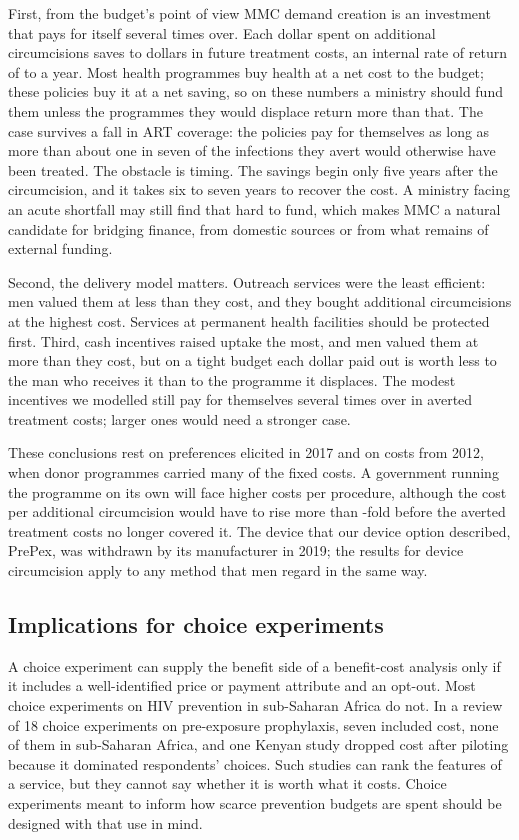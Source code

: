 \documentclass[11pt]{article}
\numberwithin{equation}{section}\numberwithin{figure}{section}\numberwithin{table}{section}
\begin{document}
First, from the budget's point of view MMC demand creation is an investment that pays for itself several times over. Each dollar spent on additional circumcisions saves \mmcBreturnMin{} to \mmcBreturnMax{} dollars in future treatment costs, an internal rate of return of \mmcBirrMin{} to \mmcBirrMax{} a year. Most health programmes buy health at a net cost to the budget; these policies buy it at a net saving, so on these numbers a ministry should fund them unless the programmes they would displace return more than that. The case survives a fall in ART coverage: the policies pay for themselves as long as more than about one in seven of the infections they avert would otherwise have been treated. The obstacle is timing. The savings begin only five years after the circumcision, and it takes six to seven years to recover the cost. A ministry facing an acute shortfall may still find that hard to fund, which makes MMC a natural candidate for bridging finance, from domestic sources or from what remains of external funding.

Second, the delivery model matters. Outreach services were the least efficient: men valued them at less than they cost, and they bought additional circumcisions at the highest cost. Services at permanent health facilities should be protected first. Third, cash incentives raised uptake the most, and men valued them at more than they cost, but on a tight budget each dollar paid out is worth less to the man who receives it than to the programme it displaces. The modest incentives we modelled still pay for themselves several times over in averted treatment costs; larger ones would need a stronger case.

These conclusions rest on preferences elicited in 2017 and on costs from 2012, when donor programmes carried many of the fixed costs. A government running the programme on its own will face higher costs per procedure, although the cost per additional circumcision would have to rise more than \mmcBreturnMin-fold before the averted treatment costs no longer covered it. The device that our device option described, PrePex, was withdrawn by its manufacturer in 2019;\cite{Star2019} the results for device circumcision apply to any method that men regard in the same way.

\subsection{Implications for choice experiments}
A choice experiment can supply the benefit side of a benefit-cost analysis only if it includes a well-identified price or payment attribute and an opt-out. Most choice experiments on HIV prevention in sub-Saharan Africa do not. In a review of 18 choice experiments on pre-exposure prophylaxis, seven included cost, none of them in sub-Saharan Africa,\cite{Wulandari2022} and one Kenyan study dropped cost after piloting because it dominated respondents' choices.\cite{Chen2023} Such studies can rank the features of a service, but they cannot say whether it is worth what it costs. Choice experiments meant to inform how scarce prevention budgets are spent should be designed with that use in mind.
\end{document}
